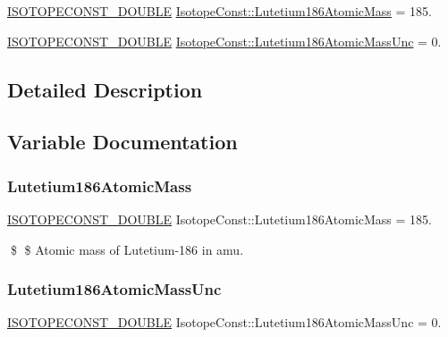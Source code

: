 \begin{DoxyCompactItemize}
\item 
\mbox{\hyperlink{group___isotope_const-_macros_ga8f45a7272ce02c0b4c65c44636ed719a}{I\+S\+O\+T\+O\+P\+E\+C\+O\+N\+S\+T\+\_\+\+D\+O\+U\+B\+LE}} \mbox{\hyperlink{group___isotope_const-_lutetium-_lu186_ga36dd6613e843bef8c49dcd83b80da639}{Isotope\+Const\+::\+Lutetium186\+Atomic\+Mass}} = 185.
\item 
\mbox{\hyperlink{group___isotope_const-_macros_ga8f45a7272ce02c0b4c65c44636ed719a}{I\+S\+O\+T\+O\+P\+E\+C\+O\+N\+S\+T\+\_\+\+D\+O\+U\+B\+LE}} \mbox{\hyperlink{group___isotope_const-_lutetium-_lu186_ga4f18c458b054acf88ce9dbedd6db3701}{Isotope\+Const\+::\+Lutetium186\+Atomic\+Mass\+Unc}} = 0.
\end{DoxyCompactItemize}


\subsection{Detailed Description}


\subsection{Variable Documentation}
\mbox{\label{group___isotope_const-_lutetium-_lu186_ga36dd6613e843bef8c49dcd83b80da639}} 
\subsubsection{\texorpdfstring{Lutetium186\+Atomic\+Mass}{Lutetium186AtomicMass}}
{\footnotesize\ttfamily \mbox{\hyperlink{group___isotope_const-_macros_ga8f45a7272ce02c0b4c65c44636ed719a}{I\+S\+O\+T\+O\+P\+E\+C\+O\+N\+S\+T\+\_\+\+D\+O\+U\+B\+LE}} Isotope\+Const\+::\+Lutetium186\+Atomic\+Mass = 185.}

\$ \$ Atomic mass of Lutetium-\/186 in amu. \mbox{\label{group___isotope_const-_lutetium-_lu186_ga4f18c458b054acf88ce9dbedd6db3701}} 
\subsubsection{\texorpdfstring{Lutetium186\+Atomic\+Mass\+Unc}{Lutetium186AtomicMassUnc}}
{\footnotesize\ttfamily \mbox{\hyperlink{group___isotope_const-_macros_ga8f45a7272ce02c0b4c65c44636ed719a}{I\+S\+O\+T\+O\+P\+E\+C\+O\+N\+S\+T\+\_\+\+D\+O\+U\+B\+LE}} Isotope\+Const\+::\+Lutetium186\+Atomic\+Mass\+Unc = 0.}

